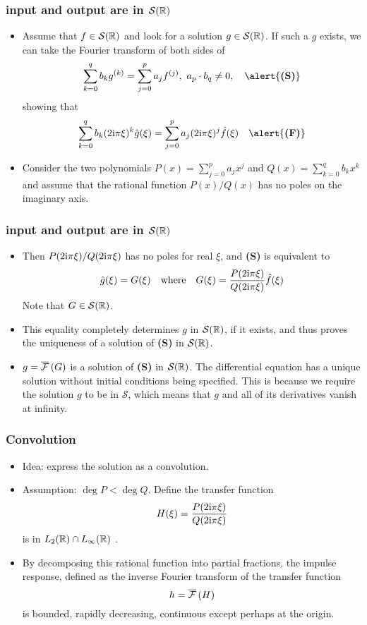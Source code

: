 \begin{frame}
\frametitle{input and output are in $\mathcal{S}(\mathbb{R})$}
\begin{itemize}
\item Assume that $f\in \mathcal{S}(\mathbb{R})$ and look for a solution $g \in \mathcal{S}(\mathbb{R})$. If such a $g$ exists, we can take the Fourier transform of both sides of
$$
\sum_{k=0}^{q}b_{k}g^{(k)}=\sum_{j=0}^{p}a_{j}f^{(j)},\ a_{p}\cdot b_{q}\neq 0,  \quad \alert{\textbf{(S)}}
$$
showing that
$$
\sum_{k=0}^{q}b_{k}(2\rmi\pi\xi)^{k}\hat{g}(\xi)=\sum_{j=0}^{p}a_{j}(2\rmi\pi\xi)^{j}\hat{f}(\xi) \quad \alert{\textbf{(F)}}
$$
\item Consider the two polynomials $P(x)= \sum_{j=0}^{p}a_{j}x^{j}$ and $Q(x)=\sum_{k=0}^{q}b_{k}x^{k}$
and assume that the rational function $P(x)/Q(x)$ has no poles on the imaginary axis.
\end{itemize}
\end{frame}

\begin{frame}
\frametitle{input and output are in $\mathcal{S}(\mathbb{R})$}
\begin{itemize}
\item Then $P(2 \mathrm{i}\pi\xi)/Q(2 \mathrm{i} \pi\xi)$ has no poles for real $\xi$, and  \alert{\textbf{(S)}} is equivalent to
$$
\hat{g}(\xi)= G(\xi) \quad \text{where} \quad G(\xi)= \frac{P(2 \mathrm{i} \pi\xi)}{Q(2\mathrm{i} \pi\xi)}\hat{f}(\xi)
$$
Note that \alert{$G \in \mathcal{S}(\mathbb{R})$}.
\item This equality completely determines $g$ in $\mathcal{S}(\mathbb{R})$, if it exists, and thus proves the uniqueness of a solution of \alert{\textbf{(S)}} in $\mathcal{S}(\mathbb{R})$.
\item $g=\overline{\mathcal{F}}\left( G \right)$ is a solution of \alert{\textbf{(S)}} in $\mathcal{S}(\mathbb{R})$.
{\tiny The differential equation has a unique solution without initial conditions being specified. This is because we require the solution $g$ to be in $\mathcal{S}$, which means that $g$ and all of its derivatives vanish at infinity.}
\end{itemize}
\end{frame}

\begin{frame}
\frametitle{Convolution}
\begin{itemize}
\item \alert{Idea:} express the solution as a convolution.
\item \alert{Assumption:} $\deg P<\deg Q$. Define the \alert{transfer function}
$$
H(\xi)=\frac{P(2 \mathrm{i} \pi\xi)}{Q(2 \mathrm{i} \pi\xi)}
$$
is in $L_2(\mathbb{R}) \cap L_\infty(\mathbb{R})$ .
\item By decomposing this rational function into partial fractions, the \alert{impulse response}, defined as the inverse Fourier transform of the \alert{transfer function}
$$
h=\overline{\mathcal{F}}\left( H \right)
$$
is bounded, rapidly decreasing, continuous except perhaps at the origin.
\end{itemize}
\end{frame}

